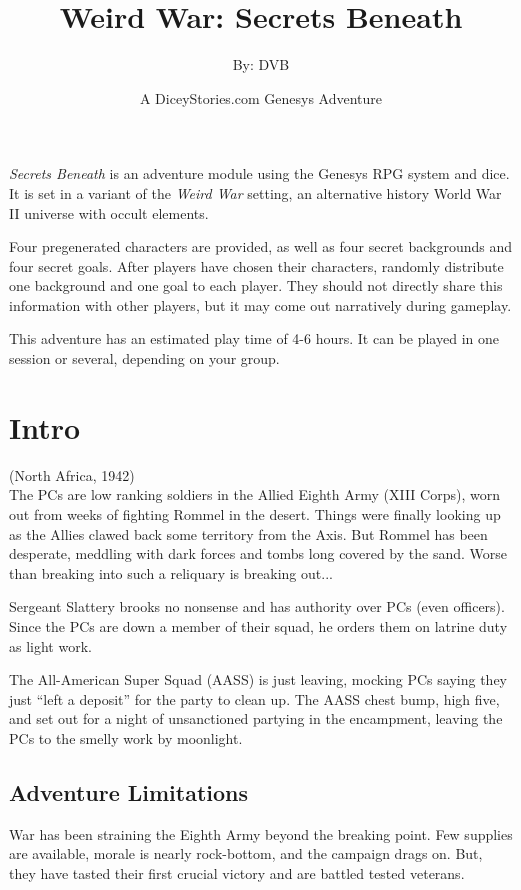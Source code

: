 \documentclass{book}
\title{Weird War: Secrets Beneath}
\author{By: DVB}
\date{A DiceyStories.com Genesys Adventure}
\newcommand{\gb}{\emph{Secrets Beneath} }
\begin{document}
\maketitle

\begin{multicols}{2}

\gb is an adventure module using the Genesys RPG system and dice.  It is set in a variant of the \emph{Weird War} setting, an alternative history World War II universe with occult elements.

Four pregenerated characters are provided, as well as four secret backgrounds and four secret goals.  After players have chosen their characters, randomly distribute one background and one goal to each player.  They should not directly share this information with other players, but it may come out narratively during gameplay.

This adventure has an estimated play time of 4-6 hours.  It can be played in one session or several, depending on your group.

\section{Intro}
(North Africa, 1942)\\

    The PCs are low ranking soldiers in the Allied Eighth Army (XIII Corps), worn out from weeks of fighting Rommel in the desert.  Things were finally looking up as the Allies clawed back some territory from the Axis.  But Rommel has been desperate, meddling with dark forces and tombs long covered by the sand.  Worse than breaking into such a reliquary is breaking out...

    Sergeant Slattery brooks no nonsense and has authority over PCs (even officers).  Since the PCs are down a member of their squad, he orders them on latrine duty as light work.

    The All-American Super Squad (AASS) is just leaving, mocking PCs saying they just ``left a deposit'' for the party to clean up.  The AASS chest bump, high five, and set out for a night of unsanctioned partying in the encampment, leaving the PCs to the smelly work by moonlight.

\subsection{Adventure Limitations}

    War has been straining the Eighth Army beyond the breaking point.  Few supplies are available, morale is nearly rock-bottom, and the campaign drags on.  But, they have tasted their first crucial victory and are battled tested veterans.
    

\end{multicols}
\end{document}
